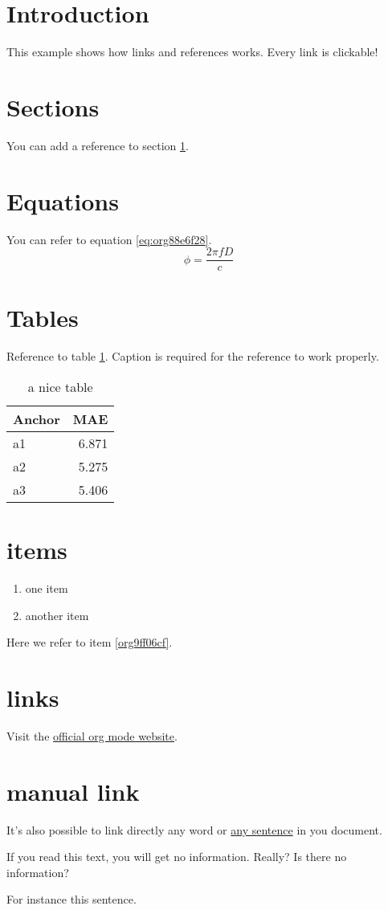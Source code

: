 


\section{Introduction}
\label{sec:org2eb557e}
This example shows how links and references works.
Every link is clickable!

\section{Sections}
\label{sec:org6f639ef}
You can add a reference to section \ref{sec:org2eb557e}.

\section{Equations}
\label{sec:org9c2ccdd}
You can refer to equation \ref{eq:org88e6f28}.
\begin{equation}
\label{eq:org88e6f28}
\phi = \frac{2\pi fD}{c}
\end{equation}

\section{Tables}
\label{sec:org878f328}
Reference to table \ref{tab:org8e34c62}.
Caption is required for the reference to work properly.

\begin{table}[htbp]
\caption{\label{tab:org8e34c62}
a nice table}
\centering
\begin{tabular}{lr}
Anchor & MAE\\
\hline
a1 & 6.871\\
a2 & 5.275\\
a3 & 5.406\\
\end{tabular}
\end{table}

\section{items}
\label{sec:org00b0f8b}
\begin{enumerate}
\item one item
\item \label{org9ff06cf}another item
\end{enumerate}
Here we refer to item \ref{org9ff06cf}.

\section{links}
\label{sec:org99a7835}
Visit the \href{https://orgmode.org/}{official org mode website}.

\section{manual link}
\label{sec:orgb3e6ba2}
It's also possible to link directly any word
or \hyperlink{thesentence}{any sentence} in you document.

If you read this text, you will get no information.  Really?
Is there no information?

For instance \hypertarget{thesentence}{this sentence}.


